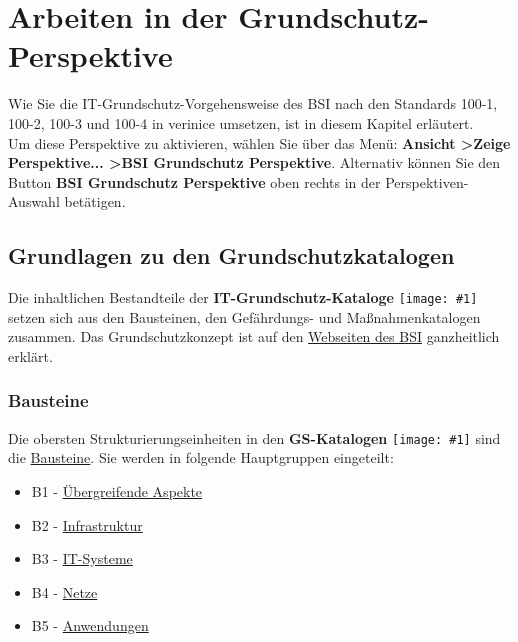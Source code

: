 \documentclass[a4paper,10pt]{book}
\newcommand{\icon}[1]{\texttt{[image: \#1]}}
\begin{document}


\chapter{Arbeiten in der Grundschutz-Perspektive}
\label{Arbeiten in der Grundschutz-Perspektive}
Wie Sie die IT-Grundschutz-Vorgehensweise des BSI nach den Standards 100-1, 100-2, 100-3 und 100-4 in verinice umsetzen,
ist in diesem Kapitel erläutert.
\newline\\
Um diese Perspektive zu aktivieren, wählen Sie über das Menü: \textbf{Ansicht \textgreater Zeige Perspektive... \textgreater BSI Grundschutz Perspektive}.
Alternativ können Sie den Button \textbf{BSI Grundschutz Perspektive} oben rechts in der Perspektiven-Auswahl betätigen.

\section{Grundlagen zu den Grundschutzkatalogen}
Die inhaltlichen Bestandteile der \textbf{IT-Grundschutz-Kataloge} \icon{Icon/GS_Kataloge.png} setzen sich
aus den Bausteinen, den Gefährdungs- und Maßnahmenkatalogen zusammen. Das Grundschutzkonzept ist auf
den \href{https://www.bsi.bund.de/cln_156/DE/Themen/weitereThemen/ITGrundschutzKataloge/itgrundschutzkataloge_node.html}{Webseiten des BSI}
ganzheitlich erklärt.

\subsection{Bausteine}
Die obersten Strukturierungseinheiten in den \textbf{GS-Katalogen} \icon{Icon/GS_Kataloge.png} sind die \href{https://www.bsi.bund.de/cln_156/DE/Themen/weitereThemen/ITGrundschutzKataloge/Inhalt/Bausteine/bausteine_node.html}{Bausteine}. Sie werden in folgende Hauptgruppen eingeteilt:
\begin{itemize}
\item B1 -
  \href{https://www.bsi.bund.de/cln_156/DE/Themen/weitereThemen/ITGrundschutzKataloge/Inhalt/Bausteine/B1uebergeordneteAspekte/b1uebergeordneteaspekte_node.html}{Übergreifende
    Aspekte}
\item B2 - \href{https://www.bsi.bund.de/cln_156/DE/Themen/weitereThemen/ITGrundschutzKataloge/Inhalt/Bausteine/B2Infrastruktur/b2infrastruktur_node.html}{Infrastruktur}
\item B3 - \href{https://www.bsi.bund.de/cln_156/DE/Themen/weitereThemen/ITGrundschutzKataloge/Inhalt/Bausteine/B3ITSysteme/b3itsysteme_node.html}{IT-Systeme}
\item B4 - \href{https://www.bsi.bund.de/cln_156/DE/Themen/weitereThemen/ITGrundschutzKataloge/Inhalt/Bausteine/B4Netze/b4netze_node.html}{Netze}
\item B5 - \href{https://www.bsi.bund.de/cln_156/DE/Themen/weitereThemen/ITGrundschutzKataloge/Inhalt/Bausteine/B5Anwendungen/b5anwendungen_node.html}{Anwendungen}
\end{itemize}
\end{document}
